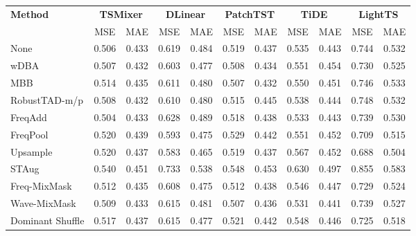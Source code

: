 \begin{table}[h!]
\centering
\vspace{0.2cm}
\renewcommand{\arraystretch}{1.1}
\begin{adjustbox}{max width=\textwidth}
\begin{tabular}{l|cc|cc|cc|cc|cc}
    \toprule
    \textbf{Method} & \multicolumn{2}{c|}{\textbf{TSMixer}} & \multicolumn{2}{c|}{\textbf{DLinear}} & \multicolumn{2}{c|}{\textbf{PatchTST}} & \multicolumn{2}{c|}{\textbf{TiDE}} & \multicolumn{2}{c}{\textbf{LightTS}} \\
     & MSE & MAE & MSE & MAE & MSE & MAE & MSE & MAE & MSE & MAE \\
    \midrule
    None          & 0.506 & 0.433 & 0.619 & 0.484 & 0.519 & 0.437 & 0.535 & 0.443 & 0.744 & 0.532 \\
    wDBA          & 0.507 & \cellcolor{secondcolor}0.432 & 0.603 & 0.477 & 0.508 & 0.434 & 0.551 & 0.454 & 0.730 & 0.525 \\
    MBB           & 0.514 & 0.435 & 0.611 & 0.480 & 0.507 & \cellcolor{secondcolor}0.432 & 0.550 & 0.451 & 0.746 & 0.533 \\
    RobustTAD-m/p & 0.508 & 0.432 & 0.610 & 0.480 & 0.515 & 0.445 & 0.538 & 0.444 & 0.748 & 0.532 \\
    FreqAdd       & \cellcolor{secondcolor}0.504 & 0.433 & 0.628 & 0.489 & 0.518 & 0.438 & 0.533 & 0.443 & 0.739 & 0.530 \\
    FreqPool      & 0.520 & 0.439 & 0.593 & 0.475 & 0.529 & 0.442 & 0.551 & 0.452 & 0.709 & 0.515 \\
    Upsample      & 0.520 & 0.437 & \cellcolor{secondcolor}0.583 & \cellcolor{secondcolor}0.465 & 0.519 & 0.437 & 0.567 & 0.452 & \cellcolor{secondcolor}0.688 & \cellcolor{secondcolor}0.504 \\
    STAug         & 0.540 & 0.451 & 0.733 & 0.538 & 0.548 & 0.453 & 0.630 & 0.497 & 0.855 & 0.583 \\
    Freq-MixMask  & 0.512 & 0.435 & 0.608 & 0.475 & 0.512 & 0.438 & 0.546 & 0.447 & 0.729 & 0.524 \\
    Wave-MixMask  & 0.509 & 0.433 & 0.615 & 0.481 & \cellcolor{secondcolor}0.507 & 0.436 & \cellcolor{secondcolor}0.531 & \cellcolor{secondcolor}0.441 & 0.739 & 0.527 \\
    Dominant Shuffle   & 0.517 & 0.437 & 0.615 & 0.477 & 0.521 & 0.442 & 0.548 & 0.446 & 0.725 & 0.518 \\
   

\end{tabular}
\end{adjustbox}
\end{table}
